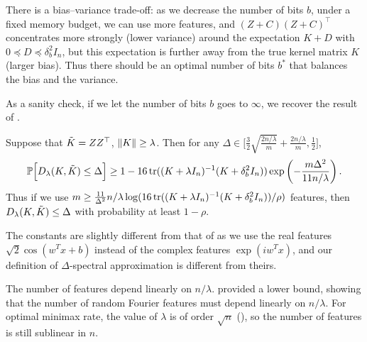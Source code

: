 There is a bias--variance trade-off: as we decrease the number of bits $b$, under
a fixed memory budget, we can use more features, and $(Z + C)(Z + C)^\top$
concentrates more strongly (lower variance) around the expectation $K + D$ with
$0 \preceq D \preceq \delta^2_b I_n$, but this expectation is further away from the true kernel
matrix $K$ (larger bias).
Thus there should be an optimal number of bits $b^*$ that balances the bias and
the variance.

As a sanity check, if we let the number of bits $b$ goes to $\infty$, we recover the
result of \citet{avron17}.
\begin{corollary}
  Suppose that $\tilde{K} = ZZ^\top$, $\|K\| \geq \lambda$.
Then for any $\Delta \in \Big[\frac{3}{2}\sqrt{\frac{2n/\lambda}{m}} + \frac{2n/\lambda}{m}, \frac{1}{2} \Big]$,
\begin{equation*}
\mathbb{P}\Big[D_{\lambda}(K,\tilde{K}) \leq \Delta\Big] \geq 1 - 16 \mathop{\rm tr}((K +
\lambda I_n)^{-1} (K + \delta^2_b I_n)) \exp \left( -\frac{m \Delta^2}{11n/\lambda} \right).
\end{equation*}
Thus if we use $m \geq \frac{11}{\Delta^2} n/\lambda \log (16 \mathop{\rm tr}((K + \lambda I_n)^{-1} (K + \delta^2_b I_n)) / \rho)$
features, then $D_\lambda(K,\tilde{K})\leq \Delta$  with probability at least $1 - \rho$.
\end{corollary}
The constants are slightly different from that of \citet{avron17} as we use the
real features $\sqrt{2} \cos(w^T x + b)$ instead of the complex features $\exp(i
w^T x)$, and our definition of $\Delta$-spectral approximation is different from theirs.

The number of features depend linearly on $n/ \lambda$.
\citet{avron17} provided a lower bound, showing that the number of random Fourier features
must depend linearly on $n / \lambda$.
For optimal minimax rate, the value of $\lambda$ is of order $\sqrt{n}$ (), so the number of features is still sublinear in $n$.

